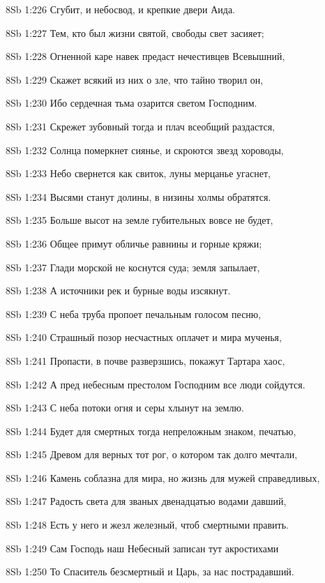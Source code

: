 \vs 8Sb 1:226 Сгубит, и небосвод, и крепкие двери Аида.

\vs 8Sb 1:227 Тем, кто был жизни святой, свободы свет засияет;

\vs 8Sb 1:228 Огненной каре навек предаст нечестивцев Всевышний,

\vs 8Sb 1:229 Скажет всякий из них о зле, что тайно творил он, 

\vs 8Sb 1:230 Ибо сердечная тьма озарится светом Господним.

\vs 8Sb 1:231 Скрежет зубовный тогда и плач всеобщий раздастся,

\vs 8Sb 1:232 Солнца померкнет сиянье, и скроются звезд хороводы,

\vs 8Sb 1:233 Небо свернется как свиток, луны мерцанье угаснет,

\vs 8Sb 1:234 Высями станут долины, в низины холмы обратятся. 

\vs 8Sb 1:235 Больше высот на земле губительных вовсе не будет,

\vs 8Sb 1:236 Общее примут обличье равнины и горные кряжи;

\vs 8Sb 1:237 Глади морской не коснутся суда; земля запылает,

\vs 8Sb 1:238 А источники рек и бурные воды изсякнут.

\vs 8Sb 1:239 С неба труба пропоет печальным голосом песню, 

\vs 8Sb 1:240 Страшный позор несчастных оплачет и мира мученья,

\vs 8Sb 1:241 Пропасти, в почве разверзшись, покажут Тартара хаос,

\vs 8Sb 1:242 А пред небесным престолом Господним все люди сойдутся.

\vs 8Sb 1:243 С неба потоки огня и серы хлынут на землю.

\vs 8Sb 1:244 Будет для смертных тогда непреложным знаком, печатью, 

\vs 8Sb 1:245 Древом для верных тот рог, о котором так долго мечтали,

\vs 8Sb 1:246 Камень соблазна для мира, но жизнь для мужей справедливых,

\vs 8Sb 1:247 Радость света для званых двенадцатью водами давший,

\vs 8Sb 1:248 Есть у него и жезл железный, чтоб смертными править.

\vs 8Sb 1:249 Сам Господь наш Небесный записан тут акростихами  

\vs 8Sb 1:250 То Спаситель безсмертный и Царь, за нас пострадавший.

